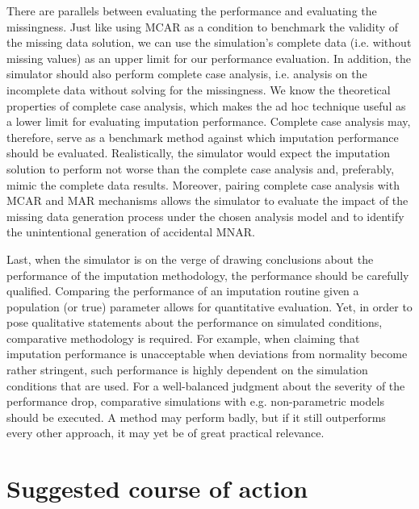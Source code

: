 \documentclass[bimj,fleqn]{w-art}
\begin{document}
There are parallels between evaluating the performance and evaluating the missingness. Just like using MCAR as a condition to benchmark the validity of the missing data solution, we can use the simulation's complete data (i.e. without missing values) as an upper limit for our performance evaluation. In addition, the simulator should also perform complete case analysis, i.e. analysis on the incomplete data without solving for the missingness. We know the theoretical properties of complete case analysis, which makes the ad hoc technique useful as a lower limit for evaluating imputation performance. Complete case analysis may, therefore, serve as a benchmark method against which imputation performance should be evaluated. Realistically, the simulator would expect the imputation solution to perform not worse than the complete case analysis and, preferably, mimic the complete data results. Moreover, pairing complete case analysis with MCAR and MAR mechanisms allows the simulator to evaluate the impact of the missing data generation process under the chosen analysis model and to identify the unintentional generation of accidental MNAR. 

Last, when the simulator is on the verge of drawing conclusions about the performance of the imputation methodology, the performance should be carefully qualified. Comparing the performance of an imputation routine given a population (or true) parameter allows for quantitative evaluation. Yet, in order to pose qualitative statements about the performance on simulated conditions, comparative methodology is required. For example, when claiming that imputation performance is unacceptable when deviations from normality become rather stringent, such performance is highly dependent on the simulation conditions that are used. For a well-balanced judgment about the severity of the performance drop, comparative simulations with e.g. non-parametric models should be executed. A method may perform badly, but if it still outperforms every other approach, it may yet be of great practical relevance.



\section{Suggested course of action}
\end{document}
